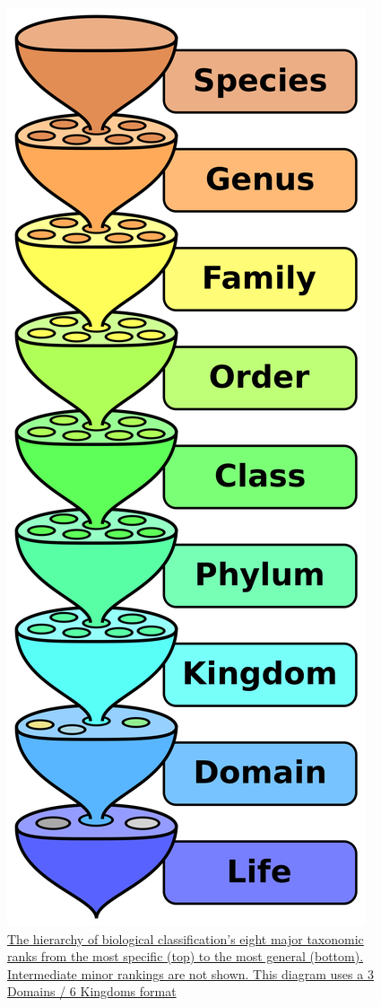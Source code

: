 \begin{figure}

{\centering \includegraphics[width=0.7\linewidth]{./figures/life/Biological_classification_L_Pengo} 

}

\caption{\href{https://commons.wikimedia.org/wiki/File:Biological_classification_L_Pengo.svg}{The hierarchy of biological classification's eight major taxonomic ranks from the most specific (top) to the most general (bottom). Intermediate minor rankings are not shown. This diagram uses a 3 Domains / 6 Kingdoms format}}\label{fig:hierarchycartoon}
\end{figure}

